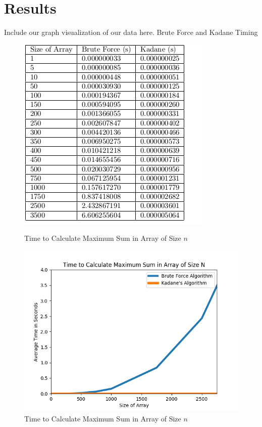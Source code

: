 \documentclass[10pt, letterpaper]{article}
\begin{document}
	\section{Results}
	Include our graph visualization of our data here. Brute Force and Kadane Timing

\begin{figure}[htbp]
  \begin{minipage}[b]{0.425\linewidth}
	  \centering
	  \includegraphics[width=\linewidth]{time-table.png}
	  \caption{Time to Calculate Maximum Sum in Array of Size $n$}
	  \label{fig:time-table}
  \end{minipage}
  \hspace{.1\linewidth}
  \begin{minipage}[b]{0.445\linewidth}
    \centering
	  \includegraphics[width=\linewidth]{python/avgTimeGraph.png}
    \caption{Time to Calculate Maximum Sum in Array of Size $n$}
    \label{fig:time-graph}
  \end{minipage}
\end{figure}
\end{document}
